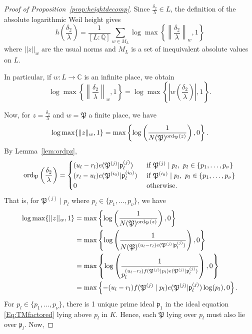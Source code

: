 \begin{proof}[Proof of Proposition~\ref{prop:heightdecomp}]Since $\frac{\delta_2}{\lambda} \in L$, the definition of the absolute logarithmic Weil height gives
\[h\left(\frac{\delta_2}{\lambda}\right)=\frac{1}{[L:\mathbb{Q}]}\sum_{w \in M_L} \log \max \left\{ \left\|\frac{\delta_2}{\lambda}\right\|_{w}, 1\right\}\]
where $||z||_w$ are the usual norms and $M_L$ is a set of inequivalent absolute values on $L$. 

In particular, if $w: L \to \mathbb{C}$ is an infinite place, we obtain
\[ \log \max \left\{ \left\|\frac{\delta_2}{\lambda}\right\|_{w}, 1\right\} = \log \max \left\{ \left|w\left(\frac{\delta_2}{\lambda}\right)\right|, 1\right\}.\]

Now, for $z = \frac{\delta_2}{\lambda}$ and $w = \mathfrak{P}$ a finite place, we have
\[ \log \max \{ \|z\|_{w}, 1\} = \max \left\{ \log\left(\frac{1}{N(\mathfrak{P})^{\operatorname{ord}_{\mathfrak{P}}(z)}} \right), 0\right\}. \]
By Lemma~\ref{lem:ordpz}, 
\[\operatorname{ord}_{\mathfrak{P}}\left( \frac{\delta_2}{\lambda}\right)=
\begin{cases}
(u_l - r_l)e(\mathfrak{P}^{(j)}|\mathfrak{p}_l^{(j)})	
	& \textnormal{ if } \mathfrak{P}^{(j)} \mid p_l , \ p_l \in \{p_1,\dots, p_{\nu}\}\\
(r_l - u_l)e(\mathfrak{P}^{(i_0)}|\mathfrak{p}_l^{(i_0)})
	& \textnormal{ if } \mathfrak{P}^{(i_0)}\mid p_l, \ p_l \in \{p_1,\dots, p_{\nu}\}\\
0 	& \textnormal{ otherwise}.
\end{cases}\]
That is, for $\mathfrak{P}^{(j)}\mid p_l$ where $p_l \in \{p_1, \dots, p_{\nu}\}$, we have
\begin{align*}
 \log \max \{ ||z||_{w}, 1\}	
 	& = \max \left\{ \log\left(\frac{1}{N(\mathfrak{P})^{\operatorname{ord}_{\mathfrak{P}}(z)}} \right), 0\right\}\\
	& = \max \left\{ \log\left(\frac{1}{N(\mathfrak{P})^{(u_l - r_l)e(\mathfrak{P}^{(j)}|\mathfrak{p}_l^{(j)})}} \right), 0\right\}\\
	& = \max \left\{ \log\left(\frac{1}{p_l^{(u_l - r_l)f(\mathfrak{P}^{(j)}\mid p_l)e(\mathfrak{P}^{(j)}|\mathfrak{p}_l^{(j)})}} \right), 0\right\}\\
	& = \max \left\{ -(u_l - r_l)f(\mathfrak{P}^{(j)}\mid p_l)e(\mathfrak{P}^{(j)}|\mathfrak{p}_l^{(j)})\log(p_l), 0\right\}.
\end{align*}
For $p_l \in \{p_1, \dots, p_{\nu}\}$, there is 1 unique prime ideal $\mathfrak{p}_1$ in the ideal equation \eqref{Eq:TMfactored} lying above $p_l$ in $K$. Hence, each $\mathfrak{P}$ lying over $p_l$ must also lie over $\mathfrak{p}_l$. Now, 

\end{proof}

